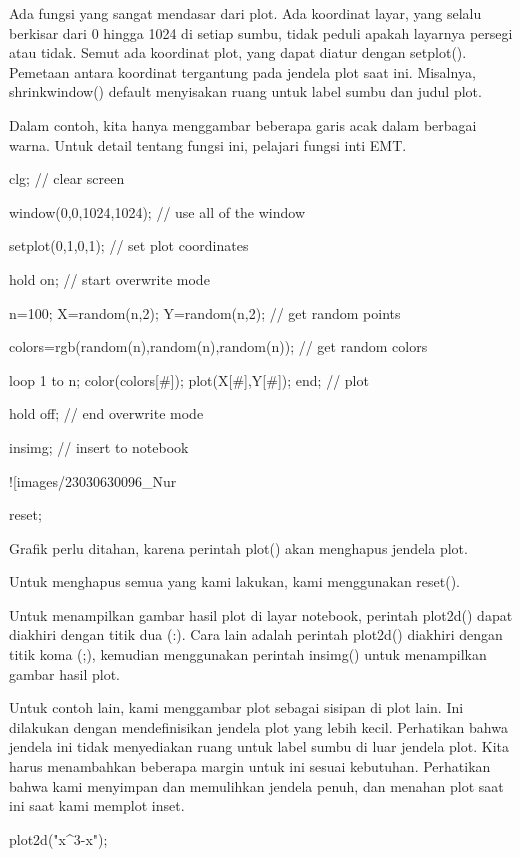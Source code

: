 \documentclass{article}
\begin{document}
Ada fungsi yang sangat mendasar dari plot. Ada koordinat layar, yang
selalu berkisar dari 0 hingga 1024 di setiap sumbu, tidak peduli
apakah layarnya persegi atau tidak. Semut ada koordinat plot, yang
dapat diatur dengan setplot(). Pemetaan antara koordinat tergantung
pada jendela plot saat ini. Misalnya, shrinkwindow() default
menyisakan ruang untuk label sumbu dan judul plot.


Dalam contoh, kita hanya menggambar beberapa garis acak dalam berbagai
warna. Untuk detail tentang fungsi ini, pelajari fungsi inti EMT.


\>clg; // clear screen

\>window(0,0,1024,1024); // use all of the window

\>setplot(0,1,0,1); // set plot coordinates

\>hold on; // start overwrite mode

\>n=100; X=random(n,2); Y=random(n,2);  // get random points

\>colors=rgb(random(n),random(n),random(n)); // get random colors

\>loop 1 to n; color(colors[#]); plot(X[#],Y[#]); end; // plot

\>hold off; // end overwrite mode

\>insimg; // insert to notebook


![images/23030630096_Nur%

\>reset;


Grafik perlu ditahan, karena perintah plot() akan menghapus jendela
plot.


Untuk menghapus semua yang kami lakukan, kami menggunakan reset().


Untuk menampilkan gambar hasil plot di layar notebook, perintah
plot2d() dapat diakhiri dengan titik dua (:). Cara lain adalah
perintah plot2d() diakhiri dengan titik koma (;), kemudian menggunakan
perintah insimg() untuk menampilkan gambar hasil plot.


Untuk contoh lain, kami menggambar plot sebagai sisipan di plot lain.
Ini dilakukan dengan mendefinisikan jendela plot yang lebih kecil.
Perhatikan bahwa jendela ini tidak menyediakan ruang untuk label sumbu
di luar jendela plot. Kita harus menambahkan beberapa margin untuk ini
sesuai kebutuhan. Perhatikan bahwa kami menyimpan dan memulihkan
jendela penuh, dan menahan plot saat ini saat kami memplot inset.


\>plot2d("x^3-x");
\end{document}
